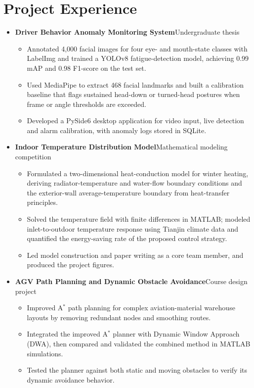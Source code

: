 \documentclass[10pt,a4paper]{article}
\newcommand{\projectheading}[2]{%
  \item \textbf{#1}\hfill #2\vspace{1pt}
}
\begin{document}
\section{Project Experience}
\begin{itemize}
  \projectheading{Driver Behavior Anomaly Monitoring System}{Undergraduate thesis}
  \begin{itemize}
    \item Annotated 4,000 facial images for four eye- and mouth-state classes
          with LabelImg and trained a YOLOv8 fatigue-detection model, achieving
          0.99 mAP and 0.98 F1-score on the test set.
    \item Used MediaPipe to extract 468 facial landmarks and built a calibration
          baseline that flags sustained head-down or turned-head postures when
          frame or angle thresholds are exceeded.
    \item Developed a PySide6 desktop application for video input, live
          detection and alarm calibration, with anomaly logs stored in SQLite.
  \end{itemize}

  \projectheading{Indoor Temperature Distribution Model}{Mathematical modeling competition}
  \begin{itemize}
    \item Formulated a two-dimensional heat-conduction model for winter heating,
          deriving radiator-temperature and water-flow boundary conditions and
          the exterior-wall average-temperature boundary from heat-transfer
          principles.
    \item Solved the temperature field with finite differences in MATLAB;
          modeled inlet-to-outdoor temperature response using Tianjin climate
          data and quantified the energy-saving rate of the proposed control
          strategy.
    \item Led model construction and paper writing as a core team member, and
          produced the project figures.
  \end{itemize}

  \projectheading{AGV Path Planning and Dynamic Obstacle Avoidance}{Course design project}
  \begin{itemize}
    \item Improved A$^{*}$ path planning for complex aviation-material warehouse
          layouts by removing redundant nodes and smoothing routes.
    \item Integrated the improved A$^{*}$ planner with Dynamic Window Approach
          (DWA), then compared and validated the combined method in MATLAB
          simulations.
    \item Tested the planner against both static and moving obstacles to verify
          its dynamic avoidance behavior.
  \end{itemize}
\end{itemize}
\end{document}
